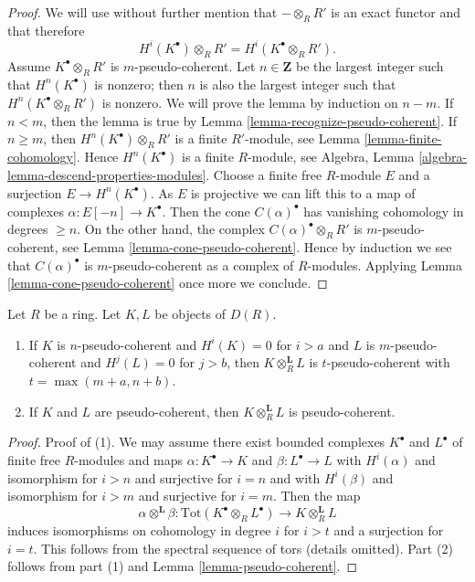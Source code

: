 \begin{proof}
We will use without further mention that $- \otimes_R R'$ is
an exact functor and that therefore
$$
H^i(K^\bullet) \otimes_R R' = H^i(K^\bullet \otimes_R R').
$$
Assume $K^\bullet \otimes_R R'$ is $m$-pseudo-coherent.
Let $n \in \mathbf{Z}$ be the largest integer such that
$H^n(K^\bullet)$ is nonzero; then $n$ is also the largest integer
such that $H^n(K^\bullet \otimes_R R')$ is nonzero.
We will prove the lemma by induction on $n - m$.
If $n < m$, then the lemma is true by
Lemma \ref{lemma-recognize-pseudo-coherent}.
If $n \geq m$, then $H^n(K^\bullet) \otimes_R R'$ is a finite
$R'$-module, see
Lemma \ref{lemma-finite-cohomology}.
Hence $H^n(K^\bullet)$ is a finite $R$-module, see
Algebra, Lemma \ref{algebra-lemma-descend-properties-modules}.
Choose a finite free $R$-module $E$ and a surjection $E \to H^n(K^\bullet)$.
As $E$ is projective we can lift this to a map of complexes
$\alpha : E[-n] \to K^\bullet$. Then the cone $C(\alpha)^\bullet$ has
vanishing cohomology in degrees $\geq n$. On the other hand, the
complex $C(\alpha)^\bullet \otimes_R R'$ is $m$-pseudo-coherent, see
Lemma \ref{lemma-cone-pseudo-coherent}.
Hence by induction we see that $C(\alpha)^\bullet$ is $m$-pseudo-coherent
as a complex of $R$-modules. Applying
Lemma \ref{lemma-cone-pseudo-coherent}
once more we conclude.
\end{proof}

\begin{lemma}
\label{lemma-tensor-pseudo-coherent}
Let $R$ be a ring. Let $K, L$ be objects of $D(R)$.
\begin{enumerate}
\item If $K$ is $n$-pseudo-coherent and $H^i(K) = 0$ for $i > a$
and $L$ is $m$-pseudo-coherent and $H^j(L) = 0$ for $j > b$, then
$K \otimes_R^\mathbf{L} L$ is $t$-pseudo-coherent with $t = \max(m + a, n + b)$.
\item If $K$ and $L$ are pseudo-coherent, then
$K \otimes_R^\mathbf{L} L$ is pseudo-coherent.
\end{enumerate}
\end{lemma}

\begin{proof}
Proof of (1). We may assume there exist bounded complexes $K^\bullet$
and $L^\bullet$ of finite free $R$-modules and maps
$\alpha : K^\bullet \to K$ and $\beta : L^\bullet \to L$ with
$H^i(\alpha)$ and isomorphism for $i > n$ and surjective for $i = n$ and with
$H^i(\beta)$ and isomorphism for $i > m$ and surjective for $i = m$.
Then the map
$$
\alpha \otimes^\mathbf{L} \beta :
\text{Tot}(K^\bullet \otimes_R L^\bullet)
\to K \otimes_R^\mathbf{L} L
$$
induces isomorphisms on cohomology in degree $i$ for
$i > t$ and a surjection for $i = t$. This follows from the
spectral sequence of tors (details omitted). Part (2) follows
from part (1) and Lemma \ref{lemma-pseudo-coherent}.
\end{proof}

